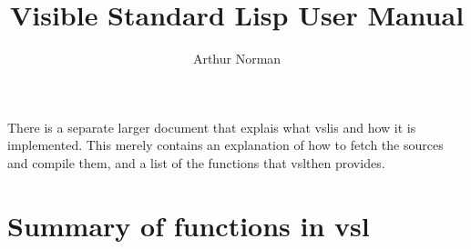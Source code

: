 \documentclass[a4paper,12pt]{article}
\title{Visible Standard Lisp User Manual}
\author{Arthur Norman}
\newcommand{\vsl}{{\ttfamily vsl}}
\begin{document}
\maketitle


There is a separate larger document that explais what \vsl is
and how it is implemented. This merely contains an explanation of how
to fetch the sources and compile them, and a list of the functions
that \vsl then provides.


\section{Summary of functions in \vsl}




\end{document}
